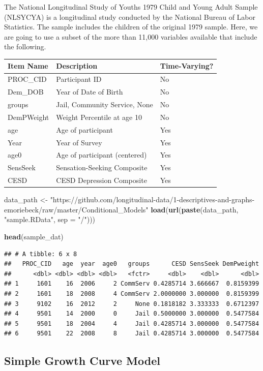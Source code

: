 \documentclass[]{article}
\newenvironment{Shaded}{\begin{snugshade}}{\end{snugshade}}
\newcommand{\KeywordTok}[1]{\textcolor[rgb]{0.13,0.29,0.53}{\textbf{{#1}}}}
\newcommand{\DataTypeTok}[1]{\textcolor[rgb]{0.13,0.29,0.53}{{#1}}}
\newcommand{\StringTok}[1]{\textcolor[rgb]{0.31,0.60,0.02}{{#1}}}
\newcommand{\NormalTok}[1]{{#1}}
\begin{document}
The National Longitudinal Study of Youths 1979 Child and Young Adult
Sample (NLSYCYA) is a longitudinal study conducted by the National
Bureau of Labor Statistics. The sample includes the children of the
original 1979 sample. Here, we are going to use a subset of the more
than 11,000 variables available that include the following.

\begin{longtable}[]{@{}lll@{}}
\toprule
Item Name & Description & Time-Varying?\tabularnewline
\midrule
\endhead
PROC\_CID & Participant ID & No\tabularnewline
Dem\_DOB & Year of Date of Birth & No\tabularnewline
groups & Jail, Community Service, None & No\tabularnewline
DemPWeight & Weight Percentile at age 10 & No\tabularnewline
age & Age of participant & Yes\tabularnewline
Year & Year of Survey & Yes\tabularnewline
age0 & Age of participant (centered) & Yes\tabularnewline
SensSeek & Sensation-Seeking Composite & Yes\tabularnewline
CESD & CESD Depression Composite & Yes\tabularnewline
\bottomrule
\end{longtable}

\begin{Shaded}
\begin{Highlighting}[]
\NormalTok{data_path <-}\StringTok{ "https://github.com/longitudinal-data/1-descriptives-and-graphs-emoriebeck/raw/master/Conditional_Models"}
\KeywordTok{load}\NormalTok{(}\KeywordTok{url}\NormalTok{(}\KeywordTok{paste}\NormalTok{(data_path, }\StringTok{"sample.RData"}\NormalTok{, }\DataTypeTok{sep =} \StringTok{"/"}\NormalTok{)))}

\KeywordTok{head}\NormalTok{(sample_dat)}
\end{Highlighting}
\end{Shaded}

\begin{verbatim}
## # A tibble: 6 x 8
##   PROC_CID   age  year  age0   groups      CESD SensSeek DemPweight
##      <dbl> <dbl> <dbl> <dbl>   <fctr>     <dbl>    <dbl>      <dbl>
## 1     1601    16  2006     2 CommServ 0.4285714 3.666667  0.8159399
## 2     1601    18  2008     4 CommServ 2.0000000 3.000000  0.8159399
## 3     9102    16  2012     2     None 0.1818182 3.333333  0.6712397
## 4     9501    14  2000     0     Jail 0.5000000 3.000000  0.5477584
## 5     9501    18  2004     4     Jail 0.4285714 3.000000  0.5477584
## 6     9501    22  2008     8     Jail 0.4285714 3.000000  0.5477584
\end{verbatim}

\subsection{Simple Growth Curve Model}\label{simple-growth-curve-model}
\end{document}
